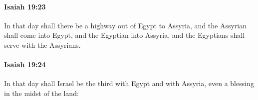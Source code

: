 		\paragraph{Isaiah 19:23} %
			\label{ISAIAH-19-23}

			In that day shall there be a highway out of Egypt to Assyria, and the Assyrian shall come into Egypt, and the Egyptian into Assyria, and the Egyptians shall serve with the Assyrians.


		\paragraph{Isaiah 19:24} %
			\label{ISAIAH-19-24}

			In that day shall Israel be the third with Egypt and with Assyria, even a blessing in the midst of the land:


